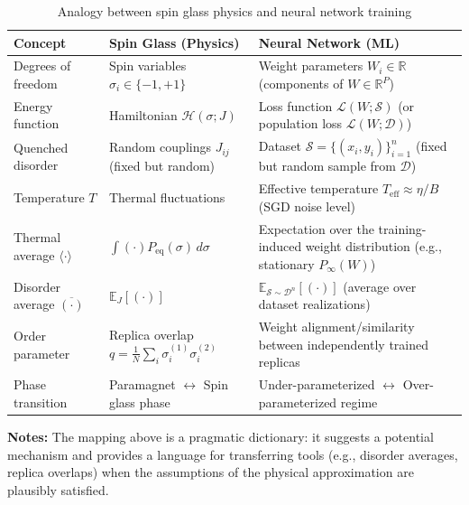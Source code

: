\documentclass[
  journal=largetwo,
  year=2025,
  volume=37,
]{cup-journal}
\begin{document}
\begin{table}[t]
\centering
\footnotesize
\begin{threeparttable}
\caption{Analogy between spin glass physics and neural network training}
\label{tab:spin_glass_nn_analogy}
\begin{tabularx}{\textwidth}{ L{0.25\textwidth} L{0.35\textwidth} >{\RaggedRight\arraybackslash}X }
\toprule
\textbf{Concept} & \textbf{Spin Glass (Physics)} & \textbf{Neural Network (ML)} \\
\midrule
Degrees of freedom & Spin variables $\sigma_i \in \{-1,+1\}$ & Weight parameters $W_i\in\mathbb{R}$ (components of $W\in\mathbb{R}^P$) \\
\addlinespace[1pt]
Energy function & Hamiltonian $\mathcal{H}(\sigma; J)$ & Loss function $\mathcal{L}(W; \mathcal{S})$ (or population loss $\mathcal{L}(W;\mathcal{D})$) \\
\addlinespace[1pt]
Quenched disorder & Random couplings $J_{ij}$ (fixed but random) & Dataset $\mathcal{S}=\{(x_i,y_i)\}_{i=1}^n$ (fixed but random sample from $\mathcal{D}$) \\
\addlinespace[1pt]
Temperature $T$ & Thermal fluctuations & Effective temperature $T_{\text{eff}}\approx\eta/B$ (SGD noise level) \\
\addlinespace[1pt]
Thermal average $\langle\cdot\rangle$ & $\int (\cdot) P_{\text{eq}}(\sigma)\,d\sigma$ & Expectation over the training-induced weight distribution (e.g., stationary $P_\infty(W)$) \\
\addlinespace[1pt]
Disorder average $\overline{(\cdot)}$ & $\mathbb{E}_{J}[(\cdot)]$ & $\mathbb{E}_{\mathcal{S}\sim\mathcal{D}^n}[(\cdot)]$ (average over dataset realizations) \\
\addlinespace[1pt]
Order parameter & Replica overlap $q=\frac{1}{N}\sum_i \sigma_i^{(1)}\sigma_i^{(2)}$ & Weight alignment/similarity between independently trained replicas \\
\addlinespace[1pt]
Phase transition & Paramagnet $\leftrightarrow$ Spin glass phase & Under-parameterized $\leftrightarrow$ Over-parameterized regime \\
\bottomrule
\end{tabularx}

\begin{tablenotes}
\footnotesize
\item[] \textbf{Notes:} The mapping above is a pragmatic dictionary: it suggests a potential mechanism and provides a language for transferring tools (e.g., disorder averages, replica overlaps) when the assumptions of the physical approximation are plausibly satisfied.
\end{tablenotes}
\end{threeparttable}
\end{table}
\end{document}
